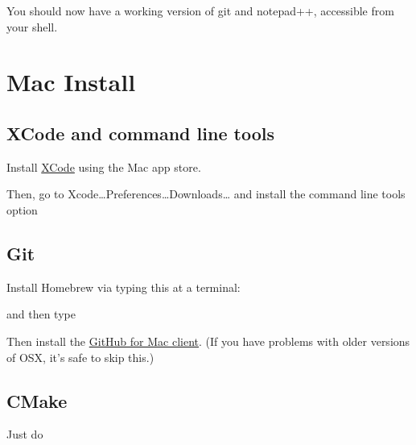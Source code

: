 You should now have a working version of git and notepad++, accessible
from your shell.

\section{Mac Install}\label{mac-install}

\subsection{XCode and command line
tools}\label{xcode-and-command-line-tools}

Install \href{https://itunes.apple.com/us/app/xcode/id497799835}{XCode}
using the Mac app store.

Then, go to Xcode\ldots{}Preferences\ldots{}Downloads\ldots{} and
install the command line tools option

\subsection{Git}\label{git-3}

Install Homebrew via typing this at a terminal:

\begin{Shaded}
\begin{Highlighting}[]
 \OtherTok{$(} \OtherTok{)}
\end{Highlighting}
\end{Shaded}

and then type

\begin{Shaded}
\begin{Highlighting}[]
 
\end{Highlighting}
\end{Shaded}

Then install the \href{http://mac.github.com}{GitHub for Mac client}.
(If you have problems with older versions of OSX, it's safe to skip
this.)

\subsection{CMake}\label{cmake-3}

Just do

\begin{Shaded}
\begin{Highlighting}[]
 
\end{Highlighting}
\end{Shaded}

